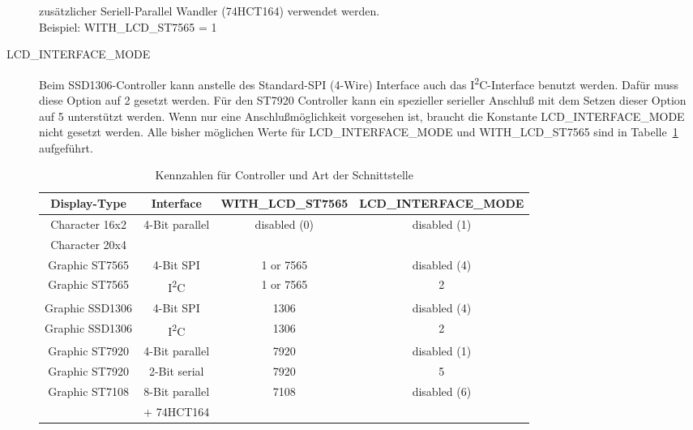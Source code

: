 \begin{description}
zusätzlicher Seriell-Parallel Wandler (74HCT164) verwendet werden.\\
Beispiel: WITH\_LCD\_ST7565 = 1 
 \item[LCD\_INTERFACE\_MODE] Beim SSD1306-Controller kann anstelle des Standard-SPI (4-Wire) Interface auch das
I\textsuperscript{2}C-Interface benutzt werden. Dafür muss diese Option auf 2 gesetzt werden.
Für den ST7920 Controller kann ein spezieller serieller Anschluß mit dem Setzen dieser Option auf 5
unterstützt werden.
Wenn nur eine Anschlußmöglichkeit vorgesehen ist, braucht die Konstante LCD\_INTERFACE\_MODE nicht gesetzt werden.
Alle bisher möglichen Werte für LCD\_INTERFACE\_MODE und WITH\_LCD\_ST7565 sind in Tabelle~\ref{tab:cod-display} aufgeführt.\\

\begin{table}[H]
  \begin{center}
    \begin{tabular}{| c | c | c | c|}
    \hline
 Display-Type &  Interface          & WITH\_LCD\_ST7565 &  LCD\_INTERFACE\_MODE \\
    \hline
    \hline
  Character 16x2    & 4-Bit parallel &  disabled (0)       & disabled (1) \\
  Character 20x4    &                &              &      \\
    \hline
  Graphic ST7565         & 4-Bit SPI      & 1 or 7565  & disabled (4) \\
    \hline
  Graphic ST7565  & I\textsuperscript{2}C & 1 or 7565  &   2 \\
    \hline
  Graphic SSD1306        & 4-Bit SPI      & 1306  & disabled (4) \\
    \hline
  Graphic SSD1306  & I\textsuperscript{2}C & 1306  &   2 \\
    \hline
  Graphic ST7920         & 4-Bit parallel       & 7920  & disabled (1) \\
    \hline
  Graphic ST7920         & 2-Bit serial   & 7920  &  5 \\
    \hline
  Graphic ST7108         & 8-Bit parallel  & 7108  & disabled (6) \\
                           &    + 74HCT164   &       &      \\
    \hline
    \end{tabular}
  \end{center}
  \caption{Kennzahlen für Controller und  Art der Schnittstelle}
  \label{tab:cod-display}
\end{table}


\end{description}
